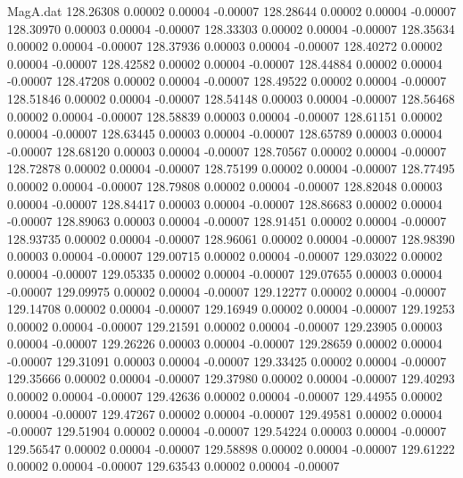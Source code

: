 \begin{filecontents}{MagA.dat}
 128.26308    0.00002    0.00004   -0.00007
 128.28644    0.00002    0.00004   -0.00007
 128.30970    0.00003    0.00004   -0.00007
 128.33303    0.00002    0.00004   -0.00007
 128.35634    0.00002    0.00004   -0.00007
 128.37936    0.00003    0.00004   -0.00007
 128.40272    0.00002    0.00004   -0.00007
 128.42582    0.00002    0.00004   -0.00007
 128.44884    0.00002    0.00004   -0.00007
 128.47208    0.00002    0.00004   -0.00007
 128.49522    0.00002    0.00004   -0.00007
 128.51846    0.00002    0.00004   -0.00007
 128.54148    0.00003    0.00004   -0.00007
 128.56468    0.00002    0.00004   -0.00007
 128.58839    0.00003    0.00004   -0.00007
 128.61151    0.00002    0.00004   -0.00007
 128.63445    0.00003    0.00004   -0.00007
 128.65789    0.00003    0.00004   -0.00007
 128.68120    0.00003    0.00004   -0.00007
 128.70567    0.00002    0.00004   -0.00007
 128.72878    0.00002    0.00004   -0.00007
 128.75199    0.00002    0.00004   -0.00007
 128.77495    0.00002    0.00004   -0.00007
 128.79808    0.00002    0.00004   -0.00007
 128.82048    0.00003    0.00004   -0.00007
 128.84417    0.00003    0.00004   -0.00007
 128.86683    0.00002    0.00004   -0.00007
 128.89063    0.00003    0.00004   -0.00007
 128.91451    0.00002    0.00004   -0.00007
 128.93735    0.00002    0.00004   -0.00007
 128.96061    0.00002    0.00004   -0.00007
 128.98390    0.00003    0.00004   -0.00007
 129.00715    0.00002    0.00004   -0.00007
 129.03022    0.00002    0.00004   -0.00007
 129.05335    0.00002    0.00004   -0.00007
 129.07655    0.00003    0.00004   -0.00007
 129.09975    0.00002    0.00004   -0.00007
 129.12277    0.00002    0.00004   -0.00007
 129.14708    0.00002    0.00004   -0.00007
 129.16949    0.00002    0.00004   -0.00007
 129.19253    0.00002    0.00004   -0.00007
 129.21591    0.00002    0.00004   -0.00007
 129.23905    0.00003    0.00004   -0.00007
 129.26226    0.00003    0.00004   -0.00007
 129.28659    0.00002    0.00004   -0.00007
 129.31091    0.00003    0.00004   -0.00007
 129.33425    0.00002    0.00004   -0.00007
 129.35666    0.00002    0.00004   -0.00007
 129.37980    0.00002    0.00004   -0.00007
 129.40293    0.00002    0.00004   -0.00007
 129.42636    0.00002    0.00004   -0.00007
 129.44955    0.00002    0.00004   -0.00007
 129.47267    0.00002    0.00004   -0.00007
 129.49581    0.00002    0.00004   -0.00007
 129.51904    0.00002    0.00004   -0.00007
 129.54224    0.00003    0.00004   -0.00007
 129.56547    0.00002    0.00004   -0.00007
 129.58898    0.00002    0.00004   -0.00007
 129.61222    0.00002    0.00004   -0.00007
 129.63543    0.00002    0.00004   -0.00007

\end{filecontents}
